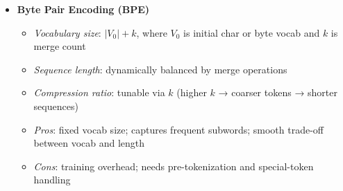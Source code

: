 \begin{itemize}[leftmargin=*]
  \item \textbf{Byte Pair Encoding (BPE)}
    \begin{itemize}[leftmargin=1em,noitemsep]
      \item \emph{Vocabulary size}: \(\lvert V_0\rvert + k\), where \(V_0\) is initial char or byte vocab and \(k\) is merge count
      \item \emph{Sequence length}: dynamically balanced by merge operations
      \item \emph{Compression ratio}: tunable via \(k\) (higher \(k\) → coarser tokens → shorter sequences)
      \item \emph{Pros}: fixed vocab size; captures frequent subwords; smooth trade-off between vocab and length  
      \item \emph{Cons}: training overhead; needs pre-tokenization and special-token handling  
    \end{itemize}
\end{itemize}


